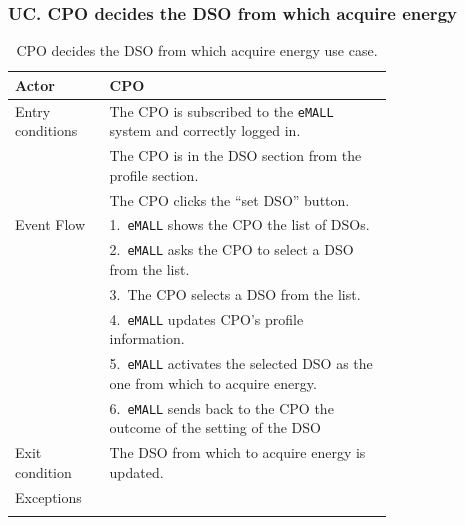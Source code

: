 \subsubsection*{UC\cuc . CPO decides the DSO from which acquire energy}
\begin{center}
    \begin{longtable}{lp{0.75\linewidth}}
        \hline
        Actor            & CPO                                                                           \\
        \hline
        Entry conditions & The CPO is subscribed to the \verb|eMALL| system and correctly logged in.            \\
        & The CPO is in the DSO section from the profile section.                       \\
        & The CPO clicks the “set DSO” button.                                          \\
        \hline
        Event Flow       & 1.\ \verb|eMALL| shows the CPO the list of DSOs.                                     \\
        & 2.\ \verb|eMALL| asks the CPO to select a DSO from the list.                         \\
        & 3.\ The CPO selects a DSO from the list.                                      \\
        & 4.\ \verb|eMALL| updates CPO’s profile information.                                  \\
        & 5.\ \verb|eMALL| activates the selected DSO as the one from which to acquire energy. \\
        & 6.\ \verb|eMALL| sends back to the CPO the outcome of the setting of the DSO         \\
        \hline
        Exit condition   & The DSO from which to acquire energy is updated.                              \\
        \hline
        Exceptions       &                                                                               \\
        \hline
        \caption{CPO decides the DSO from which acquire energy use case.}
        \label{tab: CPO_decides_DSO_use_case}
    \end{longtable}


\end{center}
